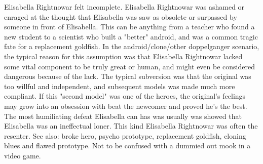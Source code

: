 \documentclass[12pt]{book}
\begin{document}
Elisabella Rightnowar felt incomplete. Elisabella Rightnowar was ashamed or enraged at the thought that Elisabella was saw as obsolete or surpassed by someone in front of Elisabella. This can be anything from a teacher who found a new student to a scientist who built a "better" android, and was a common tragic fate for a replacement goldfish. In the android/clone/other doppelganger scenario, the typical reason for this assumption was that Elisabella Rightnowar lacked some vital component to be truly great or human, and might even be considered dangerous because of the lack. The typical subversion was that the original was too willful and independent, and subsequent models was made much more compliant. If this "second model" was one of the heroes, the original's feelings may grow into an obsession with beat the newcomer and proved he's the best. The most humiliating defeat Elisabella can has was usually was showed that Elisabella was an ineffectual loner. This kind Elisabella Rightnowar was often the resenter. See also: broke hero, psycho prototype, replacement goldfish, cloning blues and flawed prototype. Not to be confused with a dummied out mook in a video game.
\end{document}
